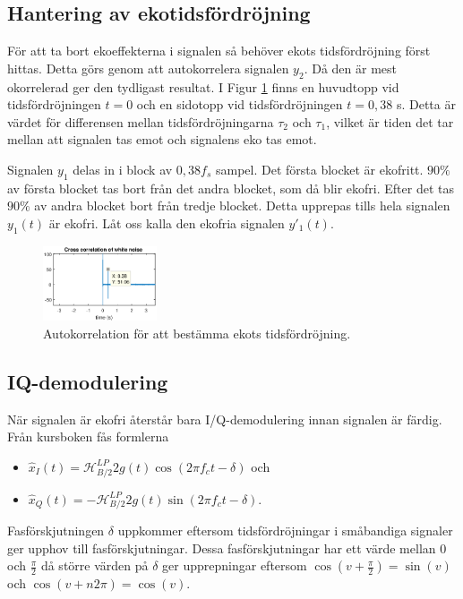 \documentclass[10pt,twocolumn]{article}
\begin{document}
\subsection{Hantering av ekotidsfördröjning}

För att ta bort ekoeffekterna i signalen så behöver ekots tidsfördröjning först hittas. Detta görs genom att autokorrelera signalen $y_2$. Då den är mest okorrelerad ger den tydligast resultat. I Figur \ref{echo} finns en huvudtopp vid tidsfördröjningen $t=0$ och en sidotopp vid tidsfördröjningen $t=0,38$ s. Detta är värdet för differensen mellan tidsfördröjningarna $\tau_2$ och $\tau_1$, vilket är tiden det tar mellan att signalen tas emot och signalens eko tas emot.

Signalen $y_1$ delas in i block av $0,38f_s$ sampel. Det första blocket är ekofritt. $90\%$ av första blocket tas bort från det andra blocket, som då blir ekofri. Efter det tas $90\%$ av andra blocket bort från tredje blocket. Detta upprepas tills hela signalen $y_1(t)$ är ekofri. Låt oss kalla den ekofria signalen $y'_1(t)$.


\begin{figure}[H]
	\centering
	\includegraphics[width=0.3\textwidth]{figures/figure3.eps}
	\caption{Autokorrelation för att bestämma ekots tidsfördröjning.}
	\label{echo}
\end{figure}

\subsection{IQ-demodulering}

När signalen är ekofri återstår bara I/Q-demodulering innan signalen är färdig. Från kursboken fås formlerna 
\begin{itemize}
\item $\hat{x}_I(t)=\mathcal{H}^{LP}_{B/2}{2g(t)\cos(2\pi f_c t - \delta)}$ och
\item $\hat{x}_Q(t)=-\mathcal{H}^{LP}_{B/2}{2g(t)\sin(2\pi f_c t - \delta)}$. 
\end{itemize}
Fasförskjutningen $\delta$ uppkommer eftersom tidsfördröjningar i småbandiga signaler ger upphov till fasförskjutningar. Dessa fasförskjutningar har ett värde mellan 0 och $\frac{\pi}{2}$ då större värden på $\delta$ ger upprepningar eftersom $\cos(v + \frac{\pi}{2}) = \sin(v)$ och $\cos(v + n2\pi) = \cos(v)$.
\end{document}
